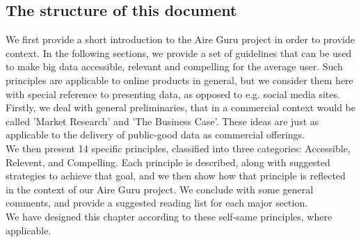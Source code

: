 \subsection{The structure of this document}

We first provide a short introduction to the Aire Guru project in order to provide context.
In the following sections, we provide a set of guidelines that can be used to make big data
accessible, relevant and compelling for the average user. Such principles are applicable to 
online products in general, but we consider them here with special reference to presenting
data, as opposed to e.g. social media sites. \\

Firstly, we deal with general preliminaries, that in a commercial context would be called
'Market Research' and 'The Business Case'. These ideas are just as applicable to the delivery of
public-good data as commercial offerings. \\

We then present 14 specific principles, classified into three categories: Accessible, Relevent, and Compelling.
Each principle is described, along with suggested strategies to achieve that goal, and we then show
how that principle is reflected in the context of our Aire Guru project. We conclude with some
general comments, and provide a suggested reading list for each major section. \\

We have designed this chapter according to these self-same principles, where applicable.